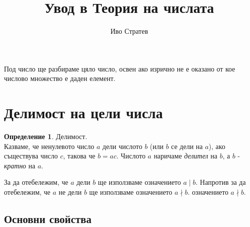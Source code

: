 \documentclass[a4paper, 12pt, oneside]{article}
\title{Увод в Теория на числата}
\author{Иво Стратев}
\theoremstyle{definition}
\newtheorem{definition}{Определение}
\begin{document}
\maketitle
        
\tableofcontents

\pagebreak

Под число ще разбираме цяло число, освен ако изрично не е оказано
от кое числово множество е даден елемент.
    
\section{Делимост на цели числа}

\begin{definition}
    Делимост. \\
    Казваме, че ненулевото число $a$ дели числото $b$ (или $b$ се дели на $a$),
    ако съществува число $c$, такова че $b = ac$.
    Числото $a$ наричаме \textit{делител} на $b$, а $b$ - \textit{кратно} на $a$.
    
    За да отебележим, че $a$ дели $b$ ще използваме означението $a \mid b$.
    Напротив за да отебележим, че $a$ не дели $b$ ще използваме означението $a \nmid b$.
    означението $a \nmid b$.
\end{definition}

\subsection{Основни свойства}
\end{document}
